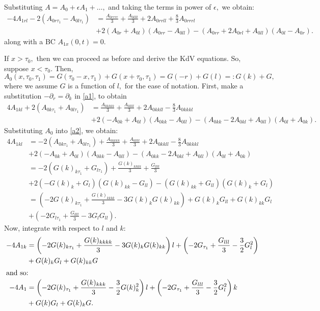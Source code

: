 \documentclass[10pt,reqno,oneside,a4paper]{article}
\begin{document}
Substituting  $A =  A_0 + \epsilon A_1 + \ldots,$ and taking the terms in power of $\epsilon,$ we obtain:
\begin{equation}\label{a1}
\begin{aligned}
-4A_{1rl} - 2(A_{0 r\tau_{1}} - A_{0l\tau_1}) &= \frac{A_{0rrrr}}{3} + \frac{A_{0llll}}{3} + 2A_{0rrll} +\frac{8}{3}A_{0rrrl} \\
&+ 2(A_{0r} +  A_{0l})(A_{0rr} - A_{0ll}) - (A_{0rr} + 2A_{0rl} + A_{0ll})(A_{0l} - A_{0r}). 
\end{aligned}
\end{equation}
along with a BC $A_{1x}(0,t) = 0.$ 

If $x > \tau_0,$ then we can proceed as before and derive the KdV equations. So, suppose $x < \tau_0.$ Then, 
\[A_0(x, \tau_0, \tau_1) = G(\tau_0- x, \tau_1) + G(x+\tau_0, \tau_1) = G(-r) + G(l) =: G(k) + G,\]
where we assume $G$ is a function of $l,$ for the ease of notation. First, make a substitution $- \partial_r = \partial_k$ in \eqref{a1}, to obtain 
\begin{equation}\label{a2}
\begin{aligned}
4A_{1kl}  + 2(A_{0 k\tau_{1}} + A_{0l\tau_1}) &= \frac{A_{0kkkk}}{3} + \frac{A_{0llll}}{3} + 2A_{0kkll} -\frac{8}{3}A_{0kkkl} \\
&+ 2(-A_{0k} +  A_{0l})(A_{0kk} - A_{0ll}) - (A_{0kk} - 2A_{0kl} + A_{0ll})(A_{0l} + A_{0k}). 
\end{aligned}
\end{equation}
Substituting $A_0$ into \eqref{a2}, we obtain:
\begin{align*}
4A_{1kl} &= -2(A_{0 k\tau_{1}} + A_{0l\tau_1}) + \frac{A_{0kkkk}}{3} + \frac{A_{0llll}}{3} + 2A_{0kkll} -\frac{8}{3}A_{0kkkl} \\
&+ 2(-A_{0k} +  A_{0l})(A_{0kk} - A_{0ll}) - (A_{0kk} - 2A_{0kl} + A_{0ll})(A_{0l} + A_{0k}) \\
&= - 2(G(k)_{k\tau_{1}} + G_{l\tau_{1}}) + \frac{G(k)_{kkkk}}{3} + \frac{G_{llll}}{3}  \\
&+ 2\left(-G(k)_k + G_l\right)\left(G(k)_{kk} - G_{ll}\right) - \left( G(k)_{kk} + G_{ll}\right)\left(G(k)_k + G_l\right) \\
&= (-2G(k)_{k\tau_{1}} + \frac{G(k)_{kkkk}}{3} - 3G(k)_kG(k)_{kk}) +G(k)_kG_{ll} + G(k)_{kk}G_l \\
&+ (-2G_{l\tau_{1}} + \frac{G_{llll}}{3} - 3G_l G_{ll}).
\end{align*}
Now, integrate with respect to $l$ and $k$:
\begin{align*}
-4A_{1k} &= \left(-2G(k)_{k\tau_{1}} + \frac{G(k)_{kkkk}}{3} - 3G(k)_kG(k)_{kk}\right)l + \left(-2G_{\tau_{1}} + \frac{G_{lll}}{3} - \frac{3}{2}G_l^2\right) \\
&+ G(k)_kG_{l} + G(k)_{kk}G \\
\intertext{and so:}
-4A_{1} &=  \left(-2G(k)_{\tau_{1}} + \frac{G(k)_{kkk}}{3} - \frac{3}{2}G(k)_k^2 \right)l + \left(-2G_{\tau_{1}} + \frac{G_{lll}}{3} - \frac{3}{2}G_l^2\right)k \\
&+ G(k)G_{l} + G(k)_{k}G .
\end{align*} 
\end{document}
